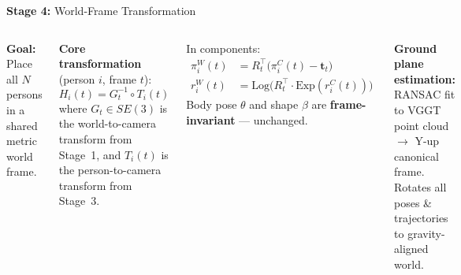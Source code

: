\documentclass[aspectratio=169,11pt]{beamer}
\newcommand{\stage}[2]{\textcolor{accentblue}{\textbf{Stage #1:}} #2}
\begin{document}
\begin{frame}{\stage{4}{World-Frame Transformation}}
  \begin{columns}[T]
      \textbf{Goal:} Place all $N$ persons in a shared metric world frame.

      \vspace{0.5em}
      \textbf{Core transformation} (person $i$, frame $t$):
      \[
        H_i(t) = G_t^{-1} \circ T_i(t)
      \]
      where $G_t \in SE(3)$ is the world-to-camera transform from Stage~1,
      and $T_i(t)$ is the person-to-camera transform from Stage~3.

      \vspace{0.4em}
      In components:
      \begin{align*}
        \pi^W_i(t) &= R_t^\top \bigl(\pi^C_i(t) - \mathbf{t}_t\bigr) \\
        r^W_i(t)   &= \text{Log}\bigl(R_t^\top \cdot \text{Exp}(r^C_i(t))\bigr)
      \end{align*}
      Body pose $\theta$ and shape $\beta$ are \textbf{frame-invariant} — unchanged.

      \vspace{0.4em}
      \textbf{Ground plane estimation:}\\
      RANSAC fit to VGGT point cloud $\to$ Y-up canonical frame.\\
      Rotates all poses \& trajectories to gravity-aligned world.


\end{columns}
\end{frame}
\end{document}
